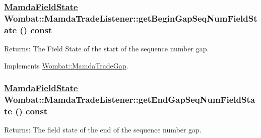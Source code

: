 \hypertarget{classWombat_1_1MamdaTradeListener_95aa1252a009b9d4805205cf776557eb}{
\subsubsection[getBeginGapSeqNumFieldState]{\setlength{\rightskip}{0pt plus 5cm}\hyperlink{namespaceWombat_93aac974f2ab713554fd12a1fa3b7d2a}{Mamda\-Field\-State} Wombat::Mamda\-Trade\-Listener::get\-Begin\-Gap\-Seq\-Num\-Field\-State () const}}
\label{classWombat_1_1MamdaTradeListener_95aa1252a009b9d4805205cf776557eb}


\begin{Desc}
\item[Returns:]The Field State of the start of the sequence number gap. \end{Desc}


Implements \hyperlink{classWombat_1_1MamdaTradeGap_891a25b9fc967b839326754b5cc8010e}{Wombat::Mamda\-Trade\-Gap}.\hypertarget{classWombat_1_1MamdaTradeListener_dccea0e36079c7120b9d63506b0f0543}{
\subsubsection[getEndGapSeqNumFieldState]{\setlength{\rightskip}{0pt plus 5cm}\hyperlink{namespaceWombat_93aac974f2ab713554fd12a1fa3b7d2a}{Mamda\-Field\-State} Wombat::Mamda\-Trade\-Listener::get\-End\-Gap\-Seq\-Num\-Field\-State () const}}
\label{classWombat_1_1MamdaTradeListener_dccea0e36079c7120b9d63506b0f0543}


\begin{Desc}
\item[Returns:]The field state of the end of the sequence number gap. \end{Desc}


